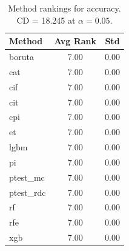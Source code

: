 \begin{table}[h]
\centering
\caption{Method rankings for accuracy. CD = 18.245 at $\alpha=0.05$.}
\label{tab:ranks_accuracy}
\begin{tabular}{lcc}
\toprule
Method & Avg Rank & Std \\
\midrule
boruta & 7.00 & 0.00 \\
cat & 7.00 & 0.00 \\
cif & 7.00 & 0.00 \\
cit & 7.00 & 0.00 \\
cpi & 7.00 & 0.00 \\
et & 7.00 & 0.00 \\
lgbm & 7.00 & 0.00 \\
pi & 7.00 & 0.00 \\
ptest_mc & 7.00 & 0.00 \\
ptest_rdc & 7.00 & 0.00 \\
rf & 7.00 & 0.00 \\
rfe & 7.00 & 0.00 \\
xgb & 7.00 & 0.00 \\
\bottomrule
\end{tabular}
\end{table}